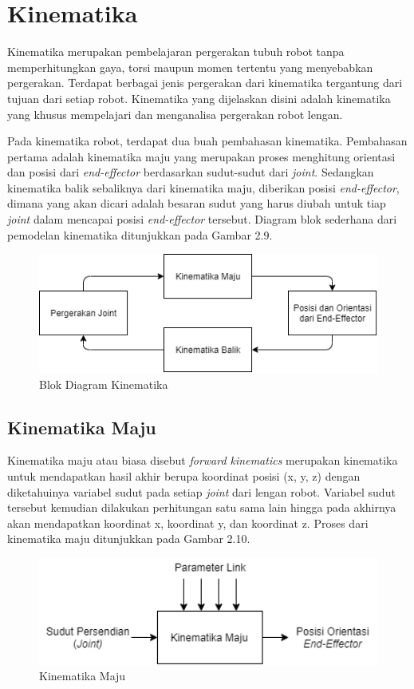 \section{Kinematika}
Kinematika merupakan pembelajaran pergerakan tubuh robot tanpa memperhitungkan gaya, torsi maupun momen tertentu yang menyebabkan pergerakan. Terdapat berbagai jenis pergerakan dari kinematika tergantung dari tujuan dari setiap robot. Kinematika yang dijelaskan disini adalah kinematika yang khusus mempelajari dan menganalisa pergerakan robot lengan.  

Pada kinematika robot, terdapat dua buah pembahasan kinematika. Pembahasan pertama adalah kinematika maju yang merupakan proses menghitung orientasi dan posisi dari\textit{ end-effector} berdasarkan sudut-sudut dari \textit{joint}.  Sedangkan kinematika balik sebaliknya dari kinematika maju, diberikan posisi \textit{end-effector}, dimana yang akan dicari adalah besaran sudut yang harus diubah untuk tiap \textit{joint} dalam mencapai posisi \textit{end-effector} tersebut. Diagram blok sederhana dari pemodelan kinematika ditunjukkan pada Gambar 2.9.
	\begin{figure}[H]
	\centering
	\includegraphics[width=12cm]{gambar/kinematika_diagram.png}
	\caption{Blok Diagram Kinematika}
\end{figure}

\subsection{Kinematika Maju}
Kinematika maju atau biasa disebut \textit{forward kinematics} merupakan kinematika untuk mendapatkan hasil akhir berupa koordinat posisi (x, y, z) dengan diketahuinya variabel sudut pada setiap \textit{joint} dari lengan robot.  Variabel sudut tersebut kemudian dilakukan perhitungan satu sama lain hingga pada akhirnya akan mendapatkan koordinat x, koordinat y, dan koordinat z. Proses dari kinematika maju ditunjukkan pada Gambar 2.10.
	\begin{figure}[H]
	\centering
	\includegraphics[width=12cm]{gambar/Kinematika_maju.png}
	\caption{Kinematika Maju}
\end{figure}


